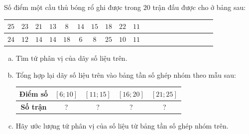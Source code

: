 \begin{bt}%

	Số điểm một cầu thủ bóng rổ ghi được trong $ 20 $ trận đấu được cho ở bảng sau:
	\begin{center}
		\begin{tabular}{|c|c|c|c|c|c|c|c|c|c|c|c|c|c|c|c|c|c|c|c|}
			\hline 
			$ 25 $	& $ 23 $ & $ 21 $ & $ 13 $ & $ 8 $ & $ 14 $ & $ 15 $ & $ 18 $ & $ 22 $ & $ 11 $ \\ 
			\hline 
			$ 24 $	& $ 12 $ & $ 14 $ & $ 14 $ & $ 18 $ & $ 6 $ & $ 8 $ & $ 25 $ & $ 10 $ & $ 11 $  \\ 
			\hline 
		\end{tabular} 
	\end{center}
	\begin{enumerate}[a)]
		\item Tìm tứ phân vị của dãy số liệu trên.
		\item Tổng hợp lại dãy số liệu trên vào bảng tần số ghép nhóm theo mẫu sau:
		\begin{center}
			\begin{tabular}{|c|c|c|c|c|}
				\hline 
				\textbf{Điểm số}	& $ \left[ 6 ; 10\right]  $ & $ \left[ 11 ; 15\right]  $ & $ \left[16 ; 20 \right]  $ & $ \left[ 21 ; 25\right]  $ \\ 
				\hline 
				\textbf{Số trận}	& ? & ? & ? & ? \\ 
				\hline 
			\end{tabular} 
		\end{center}
		\item Hãy ước lượng tứ phân vị của số liệu từ bảng tần số ghép nhóm trên.
	\end{enumerate}
\end{bt}
